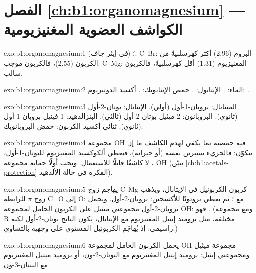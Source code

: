 \section*{الفصل \ref{ch:b1:organomagnesium} --- الكواشف العضوية المغنيزيومية}

\begin{solution}{exo:b1:organomagnesium:1}
؛  (في إيثر
جاف). C--Br: البروم (2.96) أكثر كهرسلبيةً من الكربون (2.55)، فالكربون
موجب. C--Mg: المغنيزيوم (1.31) أقل كهرسلبيةً، فالكربون سالب.
\end{solution}

\begin{solution}{exo:b1:organomagnesium:2}
الماء: .
الإيثانول: .
حمض الإيثانويك: .
أكسيد الدوتيريوم: .
\end{solution}

\begin{solution}{exo:b1:organomagnesium:3}
الميثانال: بروبان-1-أول (أولي). الإيثانال: بوتان-2-أول (ثانوي).
البروبانون: 2-ميثيل بوتان-2-أول (ثالثي). البنزالدهيد:
1-فينيل بروبان-1-أول (ثانوي). ثنائي أكسيد الكربون: حمض البروبانويك.
\end{solution}

\begin{solution}{exo:b1:organomagnesium:4}
مجموعة OH فيه حمضية بما يكفي لهدم الكاشف ما إن يتكوّن:
فالجزيء سيبرتن نفسه (أو جيرانه)، فيعطي
ألكوكسيد المغنيزيوم للبوتان-1-أول، ، لا كاشفًا قابلًا
للاستعمال. ويجب أولًا حماية مجموعة OH
(يبيّن \cref{ch:b1:acetals-protection} الفكرة في حالة الألدهيد).
\end{solution}

\begin{solution}{exo:b1:organomagnesium:5}
يهاجم زوج C--Mg كربون الكربونيل في الإيثانال، ويذهب زوج $\pi$ للرابطة C=O
إلى O:  مع ؛ ثم يعطي 
بروتونًا للأكسجين: بروبان-2-أول. ويحمل بروبان-2-أول مجموعتي ميثيل
على الكربون الحامل لمجموعة OH: فهو . (ومع مجموعة R مختلفة، مثل
بروميد إيثيل المغنيزيوم مع الإيثانال، يكون الناتج بوتان-2-أول  لكنه
راسيمي: إذ يُهاجَم الكربونيل المستوي على وجهيه بالتساوي.)
\end{solution}

\begin{solution}{exo:b1:organomagnesium:6}
يحمل الكربون الحامل لمجموعة OH مجموعة ميثيل ومجموعتي إيثيل:
بروميد إيثيل المغنيزيوم مع البوتان-2-ون، أو بروميد ميثيل المغنيزيوم مع
البنتان-3-ون.
\end{solution}

